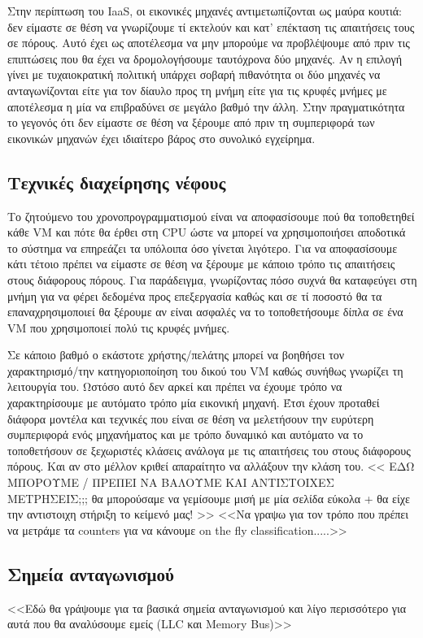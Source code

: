 Στην περίπτωση του IaaS, οι εικονικές μηχανές αντιμετωπίζονται ως μαύρα κουτιά:
δεν είμαστε σε θέση να γνωρίζουμε τί εκτελούν και κατ' επέκταση τις
απαιτήσεις τους σε πόρους. Αυτό έχει ως αποτέλεσμα να μην μπορούμε να
προβλέψουμε από πριν τις επιπτώσεις που θα έχει να δρομολογήσουμε ταυτόχρονα δύο
μηχανές. Αν η επιλογή γίνει με τυχαιοκρατική πολιτική υπάρχει σοβαρή πιθανότητα
οι δύο μηχανές να ανταγωνίζονται είτε για τον δίαυλο προς τη μνήμη είτε για τις
κρυφές μνήμες με αποτέλεσμα η μία να επιβραδύνει σε μεγάλο βαθμό την άλλη. Στην
πραγματικότητα το γεγονός ότι δεν είμαστε σε θέση να ξέρουμε από πριν τη
συμπεριφορά των εικονικών μηχανών έχει ιδιαίτερο βάρος στο συνολικό εγχείρημα.
\subsection{Τεχνικές διαχείρησης νέφους}
Το ζητούμενο του χρονοπρογραμματισμού είναι να αποφασίσουμε πού θα τοποθετηθεί
κάθε VM και πότε θα έρθει στη CPU ώστε να μπορεί να χρησιμοποιήσει αποδοτικά το
σύστημα να επηρεάζει τα υπόλοιπα όσο γίνεται λιγότερο. Για να αποφασίσουμε κάτι
τέτοιο πρέπει να είμαστε σε θέση να ξέρουμε με κάποιο τρόπο τις απαιτήσεις
στους διάφορους πόρους. Για παράδειγμα, γνωρίζοντας πόσο συχνά θα καταφεύγει στη
μνήμη για να φέρει δεδομένα προς επεξεργασία καθώς και σε τί ποσοστό θα τα
επαναχρησιμοποιεί θα ξέρουμε αν είναι ασφαλές να το τοποθετήσουμε δίπλα σε ένα
VM που χρησιμοποιεί πολύ τις κρυφές μνήμες.

Σε κάποιο βαθμό ο εκάστοτε χρήστης/πελάτης μπορεί να βοηθήσει τον
χαρακτηρισμό/την κατηγοριοποίηση του δικού του VM καθώς συνήθως γνωρίζει τη
λειτουργία του. Ωστόσο αυτό δεν αρκεί και πρέπει να έχουμε τρόπο να
χαρακτηρίσουμε με αυτόματο τρόπο μία εικονική μηχανή. Έτσι έχουν προταθεί
διάφορα μοντέλα και τεχνικές που είναι σε θέση να μελετήσουν την ευρύτερη
συμπεριφορά ενός μηχανήματος και με τρόπο δυναμικό και αυτόματο να το
τοποθετήσουν σε ξεχωριστές κλάσεις ανάλογα με τις απαιτήσεις του στους διάφορους
πόρους. Και αν στο μέλλον κριθεί απαραίτητο να αλλάξουν την κλάση του.
<<
ΕΔΩ ΜΠΟΡΟΥΜΕ / ΠΡΕΠΕΙ ΝΑ ΒΑΛΟΥΜΕ ΚΑΙ ΑΝΤΙΣΤΟΙΧΕΣ ΜΕΤΡΗΣΕΙΣ;;; θα μπορούσαμε να
γεμίσουμε μισή με μία σελίδα εύκολα + θα είχε την αντιστοιχη στήριξη το κείμενό
μας! >>
<<Να γραψω για τον τρόπο που πρέπει να μετράμε τα counters για να κάνουμε on the
fly classification.....>>

\subsection{Σημεία ανταγωνισμού}
<<Εδώ θα γράψουμε για τα βασικά σημεία ανταγωνισμού και λίγο περισσότερο για αυτά
που θα αναλύσουμε εμείς (LLC και Memory Bus)>>

